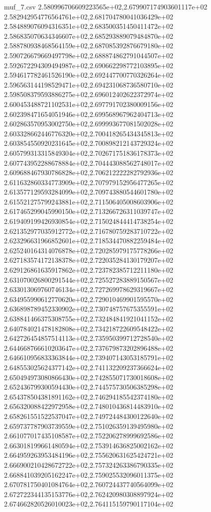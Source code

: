 \begin{filecontents*}{muf_7.csv}
2.580996706609223565e+02,2.679907174903601117e+02
2.582942954776564761e+02,2.681704780041036429e+02
2.584889076094316351e+02,2.683500351450411472e+02
2.586835070634346607e+02,2.685293889079484870e+02
2.588780938468564159e+02,2.687085392876679180e+02
2.590726679669497798e+02,2.688874862791044507e+02
2.592672294309494987e+02,2.690662298772103895e+02
2.594617782461526190e+02,2.692447700770326264e+02
2.596563144198529471e+02,2.694231068736580710e+02
2.598508379593886275e+02,2.696012402622372974e+02
2.600453488721102531e+02,2.697791702380009156e+02
2.602398471654051946e+02,2.699568967962404713e+02
2.602863570953002750e+02,2.699993677081502028e+02
2.603328662446776320e+02,2.700418265434345813e+02
2.603854550920231645e+02,2.700898212143729324e+02
2.605799313315849304e+02,2.702671751836178373e+02
2.607743952288678884e+02,2.704443088562748017e+02
2.609688467930786828e+02,2.706212222282792936e+02
2.611632860334773909e+02,2.707979152956477265e+02
2.613577129593284099e+02,2.709743880544601780e+02
2.615521275799243881e+02,2.711506405008603906e+02
2.617465299045990150e+02,2.713266726311039747e+02
2.619409199426930854e+02,2.715024844414738254e+02
2.621352977035912772e+02,2.716780759283710722e+02
2.623296631966852601e+02,2.718534470882259484e+02
2.625240164314076878e+02,2.720285979175778266e+02
2.627183574172138378e+02,2.722035284130179207e+02
2.629126861635917862e+02,2.723782385712211180e+02
2.631070026800291544e+02,2.725527283889150567e+02
2.633013069760746134e+02,2.727269978629319667e+02
2.634955990612770620e+02,2.729010469901595570e+02
2.636898789452330902e+02,2.730748757675355591e+02
2.638841466375308755e+02,2.732484841921041152e+02
2.640784021478182808e+02,2.734218722609548422e+02
2.642726454857514113e+02,2.735950399712728540e+02
2.644668766610203647e+02,2.737679873202896488e+02
2.646610956833363844e+02,2.739407143053185791e+02
2.648553025624377142e+02,2.741132209237366624e+02
2.650494973080866430e+02,2.742855071730018608e+02
2.652436799300594430e+02,2.744575730506385298e+02
2.654378504381891162e+02,2.746294185542374180e+02
2.656320088422972958e+02,2.748010436814483910e+02
2.658261551522537047e+02,2.749724484300122640e+02
2.659737787903739559e+02,2.751026359139495980e+02
2.661077017435108587e+02,2.752206278999692586e+02
2.663018199661480594e+02,2.753914636825002162e+02
2.664959263953484196e+02,2.755620631625424721e+02
2.666900210428672722e+02,2.757324263386790335e+02
2.668841039205162247e+02,2.759025532096011375e+02
2.670781750401084764e+02,2.760724437740564099e+02
2.672722344135153776e+02,2.762420980308897924e+02
2.674662820526010023e+02,2.764115159790117104e+02

\end{filecontents*}
